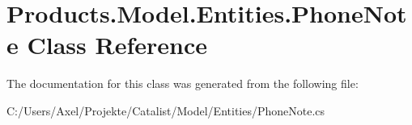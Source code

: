 \hypertarget{class_products_1_1_model_1_1_entities_1_1_phone_note}{}\section{Products.\+Model.\+Entities.\+Phone\+Note Class Reference}
\label{class_products_1_1_model_1_1_entities_1_1_phone_note}


The documentation for this class was generated from the following file\+:\begin{DoxyCompactItemize}
\item 
C\+:/\+Users/\+Axel/\+Projekte/\+Catalist/\+Model/\+Entities/Phone\+Note.\+cs\end{DoxyCompactItemize}
